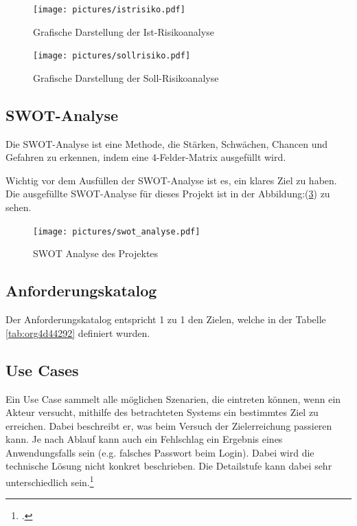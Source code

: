 \begin{figure}[H]
\centering
\texttt{[image: pictures/istrisiko.pdf]}
\caption{\label{fig:orge722da1}
Grafische Darstellung der Ist-Risikoanalyse}
\end{figure}

\begin{figure}[H]
\centering
\texttt{[image: pictures/sollrisiko.pdf]}
\caption{\label{fig:org8df460b}
Grafische Darstellung der Soll-Risikoanalyse}
\end{figure}

\newpage
\subsection{SWOT-Analyse}
\label{sec:orgcbb6fed}

Die SWOT-Analyse ist eine Methode, die Stärken, Schwächen, Chancen und
Gefahren zu erkennen, indem eine 4-Felder-Matrix ausgefüllt wird.

Wichtig vor dem Ausfüllen der SWOT-Analyse ist es, ein klares Ziel zu
haben. Die ausgefüllte SWOT-Analyse für dieses Projekt ist in der
Abbildung:(\ref{fig:org6a4313c}) zu sehen.

\begin{figure}[htbp]
\centering
\texttt{[image: pictures/swot\_analyse.pdf]}
\caption{\label{fig:org6a4313c}
SWOT Analyse des Projektes}
\end{figure}

\subsection{Anforderungskatalog}
\label{sec:org52c8a33}

Der Anforderungskatalog entspricht 1 zu 1 den Zielen, welche in der Tabelle
\ref{tab:org4d44292} definiert wurden.

\subsection{Use Cases}
\label{sec:org0b3462a}

Ein Use Case sammelt alle möglichen Szenarien, die eintreten können,
wenn ein Akteur versucht, mithilfe des betrachteten Systems ein
bestimmtes Ziel zu erreichen. Dabei beschreibt er, was beim Versuch der
Zielerreichung passieren kann. Je nach Ablauf kann auch ein Fehlschlag
ein Ergebnis eines Anwendungsfalls sein (e.g. falsches Passwort beim
Login). Dabei wird die technische Lösung nicht konkret beschrieben.
Die Detailstufe kann dabei sehr unterschiedlich sein.\footcite{usecase}

